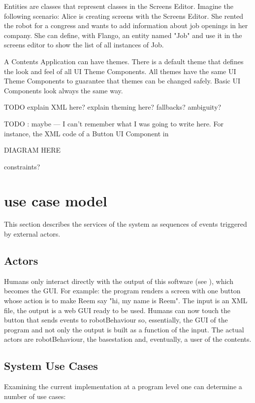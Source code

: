 Entities are classes that represent classes in the Screens Editor. 
Imagine the following scenario: Alice is creating screens with the Screens Editor.
She rented the robot for a congress and wants to add information about job openings in her company.
She can define, with Flango, an entity named "Job" and use it in the screens editor to show the list of all instances of Job.

A Contents Application can have themes.
There is a default theme that defines the look and feel of all UI Theme Components.
All themes have the same UI Theme Components to guarantee that themes can be changed safely.
Basic UI Components look always the same way.

TODO explain XML here? explain theming here? fallbacks? ambiguity?

TODO : maybe --- I can't remember what I was going to write here.
For instance, the \ac{XML} code of a Button UI Component in 



DIAGRAM HERE


constraints?

\section{use case model}
This section describes the services of the system as sequences of events triggered by external actors.

\subsection{Actors}
Humans only interact directly with the output of this software (see ), which becomes the \ac{GUI}.
For example: the program renders a screen with one button whose action is to make Reem say "hi, my name is Reem".
The input is an \ac{XML} file, the output is a web \ac{GUI} ready to be used.
Humans can now touch the button that sends events to robotBehaviour so, essentially, the \ac{GUI} of the program and not only the output is built as a function of the input.
The actual actors are robotBehaviour, the basestation and, eventually, a user of the contents.


\subsection{System Use Cases}
Examining the current implementation at a program level one can determine a number of use cases:



